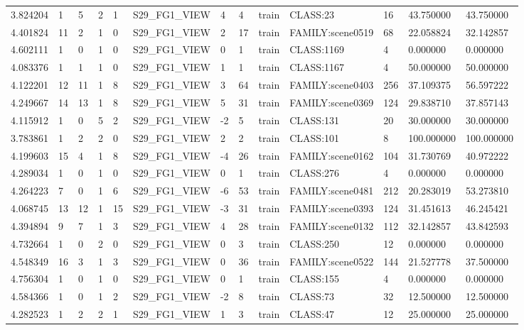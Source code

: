 \begin{tabular}{lllllllllllll}
3.824204 & 1 & 5 & 2 & 1 & S29\_FG1\_VIEW & 4 & 4 & train & CLASS:23 & 16 & 43.750000 & 43.750000 \\
4.401824 & 11 & 2 & 1 & 0 & S29\_FG1\_VIEW & 2 & 17 & train & FAMILY:scene0519 & 68 & 22.058824 & 32.142857 \\
4.602111 & 1 & 0 & 1 & 0 & S29\_FG1\_VIEW & 0 & 1 & train & CLASS:1169 & 4 & 0.000000 & 0.000000 \\
4.083376 & 1 & 1 & 1 & 0 & S29\_FG1\_VIEW & 1 & 1 & train & CLASS:1167 & 4 & 50.000000 & 50.000000 \\
4.122201 & 12 & 11 & 1 & 8 & S29\_FG1\_VIEW & 3 & 64 & train & FAMILY:scene0403 & 256 & 37.109375 & 56.597222 \\
4.249667 & 14 & 13 & 1 & 8 & S29\_FG1\_VIEW & 5 & 31 & train & FAMILY:scene0369 & 124 & 29.838710 & 37.857143 \\
4.115912 & 1 & 0 & 5 & 2 & S29\_FG1\_VIEW & -2 & 5 & train & CLASS:131 & 20 & 30.000000 & 30.000000 \\
3.783861 & 1 & 2 & 2 & 0 & S29\_FG1\_VIEW & 2 & 2 & train & CLASS:101 & 8 & 100.000000 & 100.000000 \\
4.199603 & 15 & 4 & 1 & 8 & S29\_FG1\_VIEW & -4 & 26 & train & FAMILY:scene0162 & 104 & 31.730769 & 40.972222 \\
4.289034 & 1 & 0 & 1 & 0 & S29\_FG1\_VIEW & 0 & 1 & train & CLASS:276 & 4 & 0.000000 & 0.000000 \\
4.264223 & 7 & 0 & 1 & 6 & S29\_FG1\_VIEW & -6 & 53 & train & FAMILY:scene0481 & 212 & 20.283019 & 53.273810 \\
4.068745 & 13 & 12 & 1 & 15 & S29\_FG1\_VIEW & -3 & 31 & train & FAMILY:scene0393 & 124 & 31.451613 & 46.245421 \\
4.394894 & 9 & 7 & 1 & 3 & S29\_FG1\_VIEW & 4 & 28 & train & FAMILY:scene0132 & 112 & 32.142857 & 43.842593 \\
4.732664 & 1 & 0 & 2 & 0 & S29\_FG1\_VIEW & 0 & 3 & train & CLASS:250 & 12 & 0.000000 & 0.000000 \\
4.548349 & 16 & 3 & 1 & 3 & S29\_FG1\_VIEW & 0 & 36 & train & FAMILY:scene0522 & 144 & 21.527778 & 37.500000 \\
4.756304 & 1 & 0 & 1 & 0 & S29\_FG1\_VIEW & 0 & 1 & train & CLASS:155 & 4 & 0.000000 & 0.000000 \\
4.584366 & 1 & 0 & 1 & 2 & S29\_FG1\_VIEW & -2 & 8 & train & CLASS:73 & 32 & 12.500000 & 12.500000 \\
4.282523 & 1 & 2 & 2 & 1 & S29\_FG1\_VIEW & 1 & 3 & train & CLASS:47 & 12 & 25.000000 & 25.000000 \\

\end{tabular}
